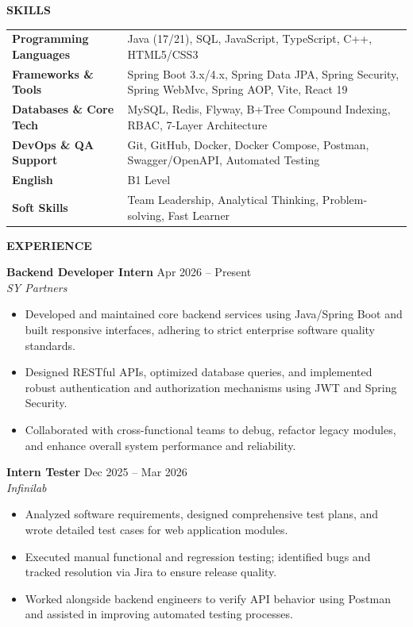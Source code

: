 ﻿\documentclass[11pt,a4paper]{article}
\newcommand{\cvsection}[1]{%
  \vspace{7pt}%
  \noindent\textbf{\large #1}\par%
  \vspace{3pt}%
}
\begin{document}
\cvsection{SKILLS}
\noindent
\begin{tabular*}{\textwidth}{@{}p{} p{}@{}}
\hline
\textbf{Programming Languages} & Java (17/21), SQL, JavaScript, TypeScript, C++, HTML5/CSS3 \\
\textbf{Frameworks \& Tools} & Spring Boot 3.x/4.x, Spring Data JPA, Spring Security, Spring WebMvc, Spring AOP, Vite, React 19 \\
\textbf{Databases \& Core Tech} & MySQL, Redis, Flyway, B+Tree Compound Indexing, RBAC, 7-Layer Architecture \\
\textbf{DevOps \& QA Support} & Git, GitHub, Docker, Docker Compose, Postman, Swagger/OpenAPI, Automated Testing \\
\textbf{English} & B1 Level \\
\textbf{Soft Skills} & Team Leadership, Analytical Thinking, Problem-solving, Fast Learner \\
\end{tabular*}

\cvsection{EXPERIENCE}

\noindent
\textbf{Backend Developer Intern} \hfill Apr 2026 -- Present \\
\textit{SY Partners}
\begin{itemize}[leftmargin=1.5em, itemsep=2pt, topsep=2pt]
    \item Developed and maintained core backend services using Java/Spring Boot and built responsive interfaces, adhering to strict enterprise software quality standards.
    \item Designed RESTful APIs, optimized database queries, and implemented robust authentication and authorization mechanisms using JWT and Spring Security.
    \item Collaborated with cross-functional teams to debug, refactor legacy modules, and enhance overall system performance and reliability.
\end{itemize}

\vspace{4pt}

\noindent
\textbf{Intern Tester} \hfill Dec 2025 -- Mar 2026 \\
\textit{Infinilab}
\begin{itemize}[leftmargin=1.5em, itemsep=2pt, topsep=2pt]
    \item Analyzed software requirements, designed comprehensive test plans, and wrote detailed test cases for web application modules.
    \item Executed manual functional and regression testing; identified bugs and tracked resolution via Jira to ensure release quality.
    \item Worked alongside backend engineers to verify API behavior using Postman and assisted in improving automated testing processes.
\end{itemize}
\end{document}
